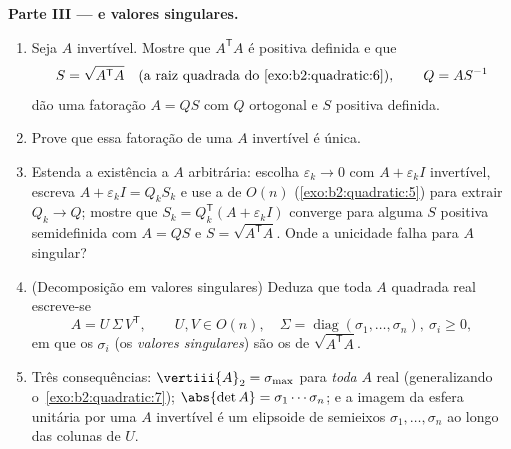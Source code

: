 \begin{problem}
\medskip
\noindent\textbf{Parte III ---  e valores
singulares.}
\begin{enumerate}[resume]
  \item Seja $A$ invertível. Mostre que $A^{\mathsf T}A$ é
        positiva definida e que
        \[
        S = \sqrt{A^{\mathsf T}A}
        \quad\text{(a raiz quadrada do~\cref{exo:b2:quadratic:6})},
        \qquad Q = AS^{-1}
        \]
        dão uma fatoração $A = QS$ com $Q$ ortogonal e
        $S$ positiva definida.
  \item Prove que essa fatoração de uma $A$ invertível é
        única.
  \item Estenda a existência a $A$ arbitrária: escolha
        $\varepsilon_k \to 0$ com $A + \varepsilon_k I$
        invertível, escreva $A + \varepsilon_kI = Q_kS_k$ e
        use a  de $O(n)$
        (\cref{exo:b2:quadratic:5}) para extrair $Q_k \to Q$;
        mostre que $S_k = Q_k^{\mathsf T}(A + \varepsilon_kI)$
        converge para alguma $S$ positiva semidefinida com $A =
        QS$ e $S = \sqrt{A^{\mathsf T}A}$. Onde a
        unicidade falha para $A$ singular?
  \item (Decomposição em valores singulares) Deduza que toda
        $A$ quadrada real escreve-se
        \[
        A = U\,\Sigma\,V^{\mathsf T},
        \qquad U, V \in O(n),\quad
        \Sigma = \operatorname{diag}(\sigma_1, \dots,
        \sigma_n),\ \sigma_i \geq 0 ,
        \]
        em que os $\sigma_i$ (os \emph{valores singulares}) são
        os  de $\sqrt{A^{\mathsf T}A}$.
  \item Três consequências: $\vertiii{A}_2 = \sigma_{\max}$ para
        \emph{toda} $A$ real (generalizando
        o~\cref{exo:b2:quadratic:7}); $\abs{\det A} =
        \sigma_1\cdots\sigma_n$; e a imagem da esfera
        unitária por uma $A$ invertível é um elipsoide de
        semieixos $\sigma_1, \dots, \sigma_n$ ao longo das colunas
        de $U$.
\end{enumerate}


\end{problem}
